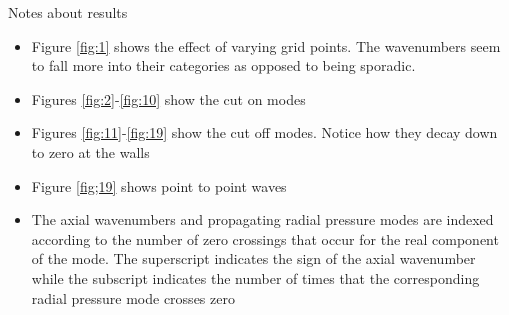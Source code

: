\documentclass[a4paper]{article}
\begin{document}
Notes about results
\begin{itemize}
    \item Figure \ref{fig:1} shows the effect of varying grid points. The wavenumbers seem to fall more 
        into their categories as opposed to being sporadic.  
    \item Figures \ref{fig:2}-\ref{fig:10} show the cut on modes 
    \item Figures \ref{fig:11}-\ref{fig:19} show the cut off modes. Notice how they 
        decay down to zero at the walls
    \item Figure \ref{fig;19} shows point to point waves 
    \item The axial wavenumbers and propagating radial pressure modes are
        indexed according to the number of zero crossings that occur for the real
        component of the mode. The superscript indicates the sign of the axial wavenumber while
        the subscript indicates the number of times that the corresponding 
        radial pressure mode crosses zero
\end{itemize}
\end{document}
